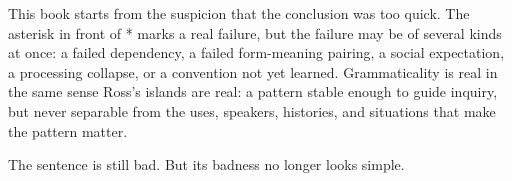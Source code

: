This book starts from the suspicion that the conclusion was too quick. The asterisk in front of * marks a real failure, but the failure may be of several kinds at once: a failed dependency, a failed form-meaning pairing, a social expectation, a processing collapse, or a convention not yet learned. Grammaticality is real in the same sense Ross's islands are real: a pattern stable enough to guide inquiry, but never separable from the uses, speakers, histories, and situations that make the pattern matter.

The sentence is still bad. But its badness no longer looks simple.
